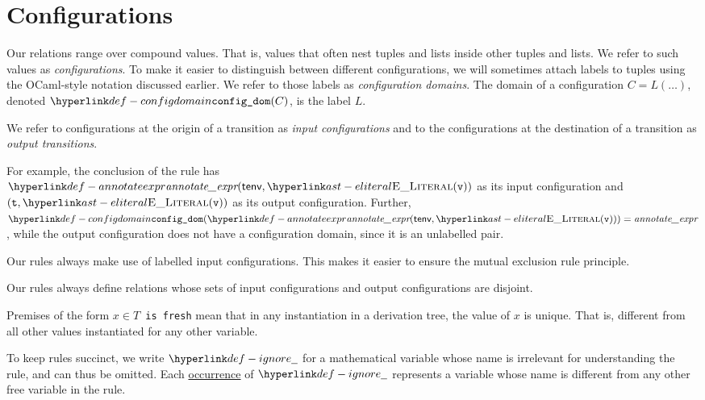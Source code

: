 \hypertarget{def-configuration}{}
\section{Configurations\label{sec:Configurations}}

\hypertarget{def-configdomain}{}
Our relations range over compound values. That is, values that often nest tuples and lists inside other tuples and lists.
We refer to such values as \emph{configurations}. To make it easier to distinguish between different configurations,
we will sometimes attach labels to tuples using the OCaml-style notation discussed earlier.
We refer to those labels as \emph{configuration domains}.
The domain of a configuration $C=L(\ldots)$, denoted $\configdomain{C}$, is the label $L$.

We refer to configurations at the origin of a transition as \emph{input configurations} and to the
configurations at the destination of a transition as \emph{output transitions}.

For example, the conclusion of the rule  has \\
$\annotateexpr{\tenv, \ELiteral(\vv)}$ as its input configuration
and $(\vt, \ELiteral(\vv))$ as its output configuration.
Further, \\
$\configdomain{\annotateexpr{\tenv, \ELiteral(\vv)}} = \textit{annotate\_expr}$,
while the output configuration does not have a configuration domain, since it is an unlabelled pair.

Our rules always make use of labelled input configurations. This makes it easier to ensure
the mutual exclusion rule principle.

Our rules always define relations whose sets of input configurations and output configurations are disjoint.

\hypertarget{def-freshvariables}{}
\begin{definition}
  Premises of the form \texttt{$x\in T$ is fresh} mean that in any
  instantiation in a derivation tree, the value of $x$ is unique.
  That is, different from all other values instantiated for any other variable.
\end{definition}

\hypertarget{def-ignore}{}
\begin{definition}
To keep rules succinct, we write $\Ignore$ for a mathematical variable whose name is
irrelevant for understanding the rule, and can thus be omitted.
Each \underline{occurrence} of $\Ignore$ represents a variable whose name is
different from any other free variable in the rule.
\end{definition}

